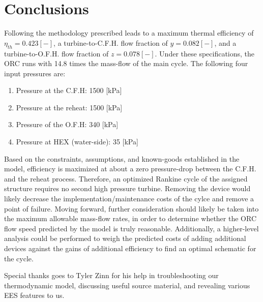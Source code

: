 \documentclass[10pt,cleanfoot]{asme2ej}
\begin{document}
\section{Conclusions}

Following the methodology prescribed leads to a maximum thermal efficiency of $\eta_{th} = 0.423 [-]$, a turbine-to-C.F.H. flow fraction of $y = 0.082 [-]$, and a turbine-to-O.F.H. flow fraction of $z = 0.078 [-]$. Under these specifications, the ORC runs with 14.8 times the mass-flow of the main cycle. The following four input pressures are:

\begin{enumerate}
\item
Pressure at the C.F.H: 1500 [kPa]
\item
Pressure at the reheat: 1500 [kPa]
\item
Pressure of the O.F.H: 340 [kPa]
\item
Pressure at HEX (water-side): 35 [kPa]
\end{enumerate}

Based on the constraints, assumptions, and known-goods established in the model, efficiency is maximized at about a zero pressure-drop between the C.F.H. and the reheat process. Therefore, an optimized Rankine cycle of the assigned structure requires no second high pressure turbine. Removing the device would likely decrease the implementation/maintenance costs of the cylce and remove a point of failure. Moving forward, further consideration should likely be taken into the maximum allowable mass-flow rates, in order to determine whether the ORC flow speed predicted by the model is truly reasonable. Additionally, a higher-level analysis could be performed to weigh the predicted costs of adding additional devices against the gains of additional efficiency to find an optimal schematic for the cycle.

\begin{acknowledgment}
Special thanks goes to Tyler Zinn for his help in troubleshooting our thermodynamic model, discussing useful source material, and revealing various EES features to us.
\end{acknowledgment}
\end{document}
